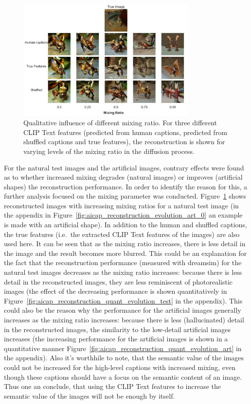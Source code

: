 \begin{figure}[ht]
    \centering
    \includegraphics[width=0.8\textwidth]{plots/aicap_reconstruction_evolution_test_0.JPEG}
    \caption[Influence of the mixing ratio]{Qualitative influence of different mixing ratio. For three different CLIP Text features (predicted from human captions, predicted from shuffled captions and true features), the reconstruction is shown for varying levels of the mixing ratio in the diffusion process. }\label{fig:aicap_reconstruction_evolution_test_0}
\end{figure}

For the natural test images and the artificial images, contrary effects were found as to whether increased mixing degrades (natural images) or improves (artificial shapes) the reconstruction performance. In order to identify the reason for this, a further analysis focused on the mixing parameter was conducted. Figure~\ref{fig:aicap_reconstruction_evolution_test_0} shows reconstructed images with increasing mixing ratios for a natural test image (in the appendix in Figure~\ref{fig:aicap_reconstruction_evolution_art_0} an example is made with an artificial shape). In addition to the human and shuffled captions, the true features (i.e.\ the extracted CLIP Text features of the images) are also used here. It can be seen that as the mixing ratio increases, there is less detail in the image and the result becomes more blurred. This could be an explanation for the fact that the reconstruction performance (measured with dreamsim) for the natural test images decreases as the mixing ratio increases: because there is less detail in the reconstructed images, they are less reminiscent of photorealistic images (the effect of the decreasing performance is shown quantitatively in Figure~\ref{fig:aicap_reconstruction_quant_evolution_test} in the appendix). This could also be the reason why the performance for the artificial images generally increases as the mixing ratio increases: because there is less (hallucinated) detail in the reconstructed images, the similarity to the low-detail artificial images increases (the increasing performance for the artificial images is shown in a quantitative manner Figure~\ref{fig:aicap_reconstruction_quant_evolution_art} in the appendix). Also it's worthhile to note, that the semantic value of the images could not be increased for the high-level captions with increased mixing, even though these captions should have a focus on the semantic content of an image. Thus one an conclude, that using the CLIP Text features to increase the semantic value of the images will not be enough by itself.

